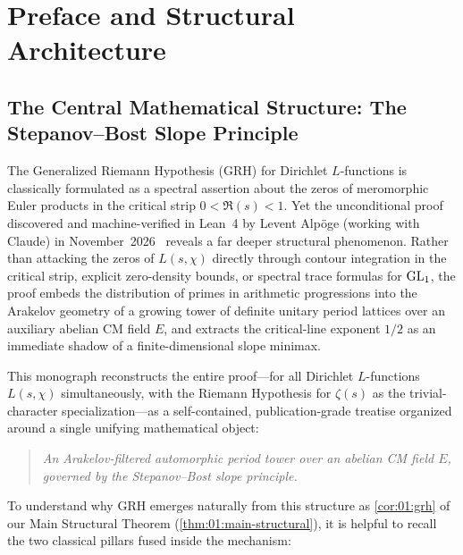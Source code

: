 \chapter{Preface and Structural Architecture}
\label{ch:00}

\section{The Central Mathematical Structure: The Stepanov--Bost Slope Principle}
\label{sec:00:vision}

The Generalized Riemann Hypothesis (GRH) for Dirichlet $L$-functions is classically formulated as a spectral assertion about the zeros of meromorphic Euler products in the critical strip $0 < \Re(s) < 1$. Yet the unconditional proof discovered and machine-verified in Lean~4 by Levent Alp\"oge (working with Claude) in November~2026~\cite{Alpoge2026} reveals a far deeper structural phenomenon. Rather than attacking the zeros of $L(s,\chi)$ directly through contour integration in the critical strip, explicit zero-density bounds, or spectral trace formulas for $\mathrm{GL}_1$, the proof embeds the distribution of primes in arithmetic progressions into the Arakelov geometry of a growing tower of definite unitary period lattices over an auxiliary abelian CM field $E$, and extracts the critical-line exponent $1/2$ as an immediate shadow of a finite-dimensional slope minimax.

This monograph reconstructs the entire proof—for all Dirichlet $L$-functions $L(s,\chi)$ simultaneously, with the Riemann Hypothesis for $\zeta(s)$ as the trivial-character specialization—as a self-contained, publication-grade treatise organized around a single unifying mathematical object:
\begin{quote}
\emph{An Arakelov-filtered automorphic period tower over an abelian CM field $E$, governed by the Stepanov--Bost slope principle.}
\end{quote}
To understand why GRH emerges naturally from this structure as \cref{cor:01:grh} of our Main Structural Theorem (\cref{thm:01:main-structural}), it is helpful to recall the two classical pillars fused inside the mechanism:

